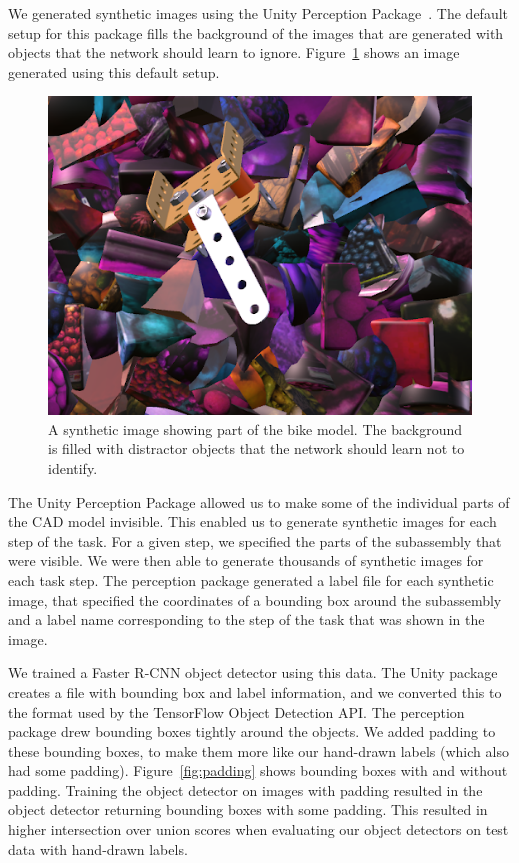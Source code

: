We generated synthetic images using the Unity Perception Package~\cite{unity}.
The default setup for this package fills the background of the images that are
generated with objects that the network should learn to ignore.
Figure~\ref{fig:perception_default} shows an image generated using this default
setup.

\begin{figure}
  \includegraphics[width=\columnwidth]{figures/synthetic/perception_default.png}
  \caption{
    A synthetic image showing part of the bike model. The background is filled
    with distractor objects that the network should learn not to identify.
  }\label{fig:perception_default}
\end{figure}

The Unity Perception Package allowed us to make some of the individual parts of
the CAD model invisible.
This enabled us to generate synthetic images for each step of the task.
For a given step, we specified the parts of the subassembly that were visible.
We were then able to generate thousands of synthetic images for each task step.
The perception package generated a label file for each synthetic image, that
specified the coordinates of a bounding box around the subassembly and a label
name corresponding to the step of the task that was shown in the image.

We trained a Faster R-CNN object detector using this data.
The Unity package creates a file with bounding box and label information, and
we converted this to the format used by the TensorFlow Object Detection API.
The perception package drew bounding boxes tightly around the objects.
We added padding to these bounding boxes, to make them more like our hand-drawn
labels (which also had some padding).
Figure~\ref{fig:padding} shows bounding boxes with and without padding.
Training the object detector on images with padding resulted in the object
detector returning bounding boxes with some padding.
This resulted in higher intersection over union scores when evaluating our
object detectors on test data with hand-drawn labels.

